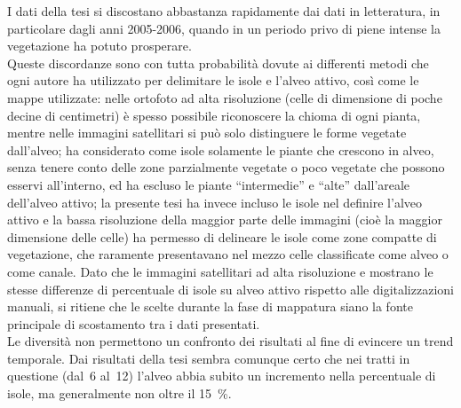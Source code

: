 I dati della tesi si discostano abbastanza rapidamente dai dati in letteratura, in particolare dagli anni 2005-2006, quando in un periodo privo di piene intense la vegetazione ha potuto prosperare.
\\
Queste discordanze sono con tutta probabilità dovute ai differenti metodi che ogni autore ha utilizzato per delimitare le isole e l'alveo attivo, così come le mappe utilizzate:
nelle ortofoto ad alta risoluzione (celle di dimensione di poche decine di centimetri) è spesso possibile riconoscere la chioma di ogni pianta, mentre nelle immagini satellitari si può solo distinguere le forme vegetate dall'alveo;
 ha considerato come isole solamente le piante che crescono in alveo, senza tenere conto delle zone parzialmente vegetate o poco vegetate che possono esservi all'interno, ed ha escluso le piante “intermedie” e “alte” dall'areale dell'alveo attivo;
la presente tesi ha invece incluso le isole nel definire l'alveo attivo e la bassa risoluzione della maggior parte delle immagini (cioè la maggior dimensione delle celle) ha permesso di delineare le isole come zone compatte di vegetazione, che raramente presentavano nel mezzo celle classificate come alveo o come canale.
Dato che le immagini satellitari ad alta risoluzione \Pl{} e \WV{} mostrano le stesse differenze di percentuale di isole su alveo attivo rispetto alle digitalizzazioni manuali, si ritiene che le scelte durante la fase di mappatura siano la fonte principale di scostamento tra i dati presentati.
\\
Le diversità non permettono un confronto dei risultati al fine di evincere un trend temporale.
Dai risultati della tesi sembra comunque certo che nei tratti in questione (dal~6 al~12) l'alveo abbia subito un incremento nella percentuale di isole, ma generalmente non oltre il \SI{15}{\percent}.

